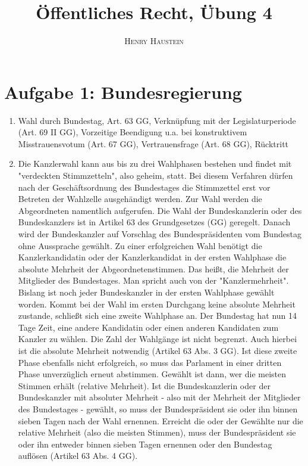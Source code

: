 \documentclass{article}
\title{\textbf{Öffentliches Recht, Übung 4}}
\author{\textsc{Henry Haustein}}
\date{}
\begin{document}
	\maketitle
	
	\section*{Aufgabe 1: Bundesregierung}
	\begin{enumerate}[label=(\alph*)]
		\item Wahl durch Bundestag, Art. 63 GG, Verknüpfung mit der Legislaturperiode (Art. 69 II GG), Vorzeitige Beendigung u.a. bei konstruktivem Misstrauensvotum (Art. 67 GG), Vertrauensfrage (Art. 68 GG), Rücktritt
		\item Die Kanzlerwahl kann aus bis zu drei Wahlphasen bestehen und findet mit "verdeckten Stimmzetteln", also geheim, statt. Bei diesem Verfahren dürfen nach der Geschäftsordnung des Bundestages die Stimmzettel erst vor Betreten der Wahlzelle ausgehändigt werden. Zur Wahl werden die Abgeordneten namentlich aufgerufen. Die Wahl der Bundeskanzlerin oder des Bundeskanzlers ist in Artikel 63 des Grundgesetzes (GG) geregelt. Danach wird der Bundeskanzler auf Vorschlag des Bundespräsidenten vom Bundestag ohne Aussprache gewählt. Zu einer erfolgreichen Wahl benötigt die Kanzlerkandidatin oder der Kanzlerkandidat in der ersten Wahlphase die absolute Mehrheit der Abgeordnetenstimmen. Das heißt, die Mehrheit der Mitglieder des Bundestages. Man spricht auch von der "Kanzlermehrheit". Bislang ist noch jeder Bundeskanzler in der ersten Wahlphase gewählt worden. Kommt bei der Wahl im ersten Durchgang keine absolute Mehrheit zustande, schließt sich eine zweite Wahlphase an. Der Bundestag hat nun 14 Tage Zeit, eine andere Kandidatin oder einen anderen Kandidaten zum Kanzler zu wählen. Die Zahl der Wahlgänge ist nicht begrenzt. Auch hierbei ist die absolute Mehrheit notwendig (Artikel 63 Abs. 3 GG). Ist diese zweite Phase ebenfalls nicht erfolgreich, so muss das Parlament in einer dritten Phase unverzüglich erneut abstimmen. Gewählt ist dann, wer die meisten Stimmen erhält (relative Mehrheit). Ist die Bundeskanzlerin oder der Bundeskanzler mit absoluter Mehrheit - also mit der Mehrheit der Mitglieder des Bundestages - gewählt, so muss der Bundespräsident sie oder ihn binnen sieben Tagen nach der Wahl ernennen. Erreicht die oder der Gewählte nur die relative Mehrheit (also die meisten Stimmen), muss der Bundespräsident sie oder ihn entweder binnen sieben Tagen ernennen oder den Bundestag auflösen (Artikel 63 Abs. 4 GG).

\end{enumerate}
\end{document}
